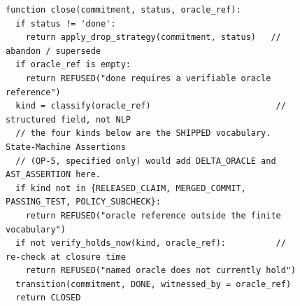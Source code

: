 \documentclass[11pt,a4paper]{article}
\theoremstyle{definition}
\theoremstyle{remark}
\begin{document}
\begin{figure}[H]
\centering
\begin{minipage}{0.92\textwidth}
\lstset{style=pseudocode}
\begin{lstlisting}[caption={The commitment-closure oracle. Closure requires a
reference from a finite vocabulary that the daemon re-verifies at closure time; free
text is rejected by construction, not by inspection.},label={alg:close},captionpos=b]
function close(commitment, status, oracle_ref):
  if status != 'done':
    return apply_drop_strategy(commitment, status)   // abandon / supersede
  if oracle_ref is empty:
    return REFUSED("done requires a verifiable oracle reference")
  kind = classify(oracle_ref)                         // structured field, not NLP
  // the four kinds below are the SHIPPED vocabulary. State-Machine Assertions
  // (OP-5, specified only) would add DELTA_ORACLE and AST_ASSERTION here.
  if kind not in {RELEASED_CLAIM, MERGED_COMMIT, PASSING_TEST, POLICY_SUBCHECK}:
    return REFUSED("oracle reference outside the finite vocabulary")
  if not verify_holds_now(kind, oracle_ref):          // re-check at closure time
    return REFUSED("named oracle does not currently hold")
  transition(commitment, DONE, witnessed_by = oracle_ref)
  return CLOSED
\end{lstlisting}
\end{minipage}
\end{figure}


\end{document}
